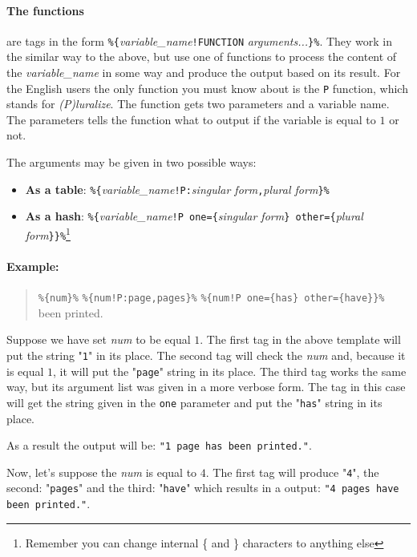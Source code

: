 \paragraph{The functions} are tags in the form \verb+%{+\textit{variable\_name}\verb+!FUNCTION+ \textit{arguments...}\verb+}%+.
They work in the similar way to the above, but use one of \mulan{} functions to process the content of the \textit{variable\_name} in some way and produce the output based on its result.
For the English users the only function you must know about is the \texttt{P} function, which stands for \textit{(P)luralize}.
The function gets two parameters and a variable name. The parameters tells the function what to output if the variable is equal to $1$ or not.

The arguments may be given in two possible ways:
\begin{itemize}
	\item \textbf{As a table}: \verb+%{+\textit{variable\_name}\verb+!P:+\textit{singular form}\verb+,+\textit{plural form}\verb+}%+
	\item \textbf{As a hash}: \verb+%{+\textit{variable\_name}\verb+!P one={+\textit{singular form}\verb+} other={+\textit{plural form}\verb+}}%+\footnote{Remember you can change internal \{
	and \} characters to anything else}
\end{itemize}

\paragraph{Example:}
\begin{quote}
	\verb+%{num}%+ \verb+%{num!P:page,pages}%+ \verb+%{num!P one={has} other={have}}%+ been printed.
\end{quote}
Suppose we have set \textit{num} to be equal $1$. The first tag in the above template will put the string "\texttt{1}" in its place.
The second tag will check the \textit{num} and, because it is equal $1$, it will put the "\texttt{page}" string in its place.
The third tag works the same way, but its argument list was given in a more verbose form. The tag in this case will get the string given in the \texttt{one} parameter
and put the "\texttt{has}" string in its place.

As a result the output will be: \texttt{"1 page has been printed."}.

Now, let's suppose the \textit{num} is equal to $4$. 
The first tag will produce "\texttt{4}", the second: "\texttt{pages}" and the third: "\texttt{have}" which results in a output:
\texttt{"4 pages have been printed."}.

